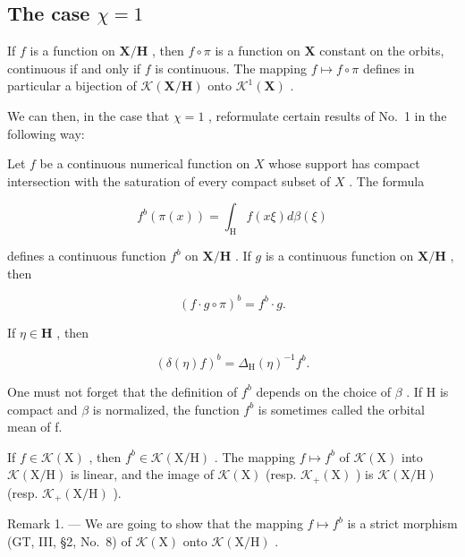 \subsection{\texorpdfstring{The case \(\chi = 1\)}{The case \textbackslash chi = 1}}

If \(f\) is a function on \(\mathbf{X} / \mathbf{H}\) , then \(f \circ \pi\) is a function on \(\mathbf{X}\) constant on the orbits, continuous if and only if \(f\) is continuous. The mapping \(f \mapsto f \circ \pi\) defines in particular a bijection of \(\mathcal{K}(\mathbf{X} / \mathbf{H})\) onto \(\mathcal{K}^1(\mathbf{X})\) .

We can then, in the case that \(\chi = 1\) , reformulate certain results of No.~1 in the following way:

Let \(f\) be a continuous numerical function on \(X\) whose support has compact intersection with the saturation of every compact subset of \(X\) . The formula

\[
f ^ {b} (\pi (x)) = \int_ {\mathrm{H}} f (x \xi) d \beta (\xi)\tag{3}
\]

defines a continuous function \(f^{b}\) on \(\mathbf{X} / \mathbf{H}\) . If \(g\) is a continuous function on \(\mathbf{X} / \mathbf{H}\) , then

\[
(f \cdot g \circ \pi) ^ {b} = f ^ {b} \cdot g.\tag{4}
\]

If \(\eta \in \mathbf{H}\) , then

\[
\left(\delta (\eta) f\right) ^ {b} = \Delta_ {\mathrm{H}} (\eta) ^ {- 1} f ^ {b}.\tag{5}
\]

One must not forget that the definition of \(f^{b}\) depends on the choice of \(\beta\) . If H is compact and \(\beta\) is normalized, the function \(f^{b}\) is sometimes called the orbital mean of f.

If \(f \in \mathcal{K}(\mathrm{X})\) , then \(f^{b} \in \mathcal{K}(\mathrm{X / H})\) . The mapping \(f \mapsto f^{b}\) of \(\mathcal{K}(\mathrm{X})\) into \(\mathcal{K}(\mathrm{X / H})\) is linear, and the image of \(\mathcal{K}(\mathrm{X})\) (resp. \(\mathcal{K}_{+}(\mathrm{X})\) ) is \(\mathcal{K}(\mathrm{X / H})\) (resp. \(\mathcal{K}_{+}(\mathrm{X / H})\) ).

Remark 1. --- We are going to show that the mapping \(f \mapsto f^{b}\) is a strict morphism (GT, III, §2, No.~8) of \(\mathcal{K}(\mathrm{X})\) onto \(\mathcal{K}(\mathrm{X}/\mathrm{H})\) .

